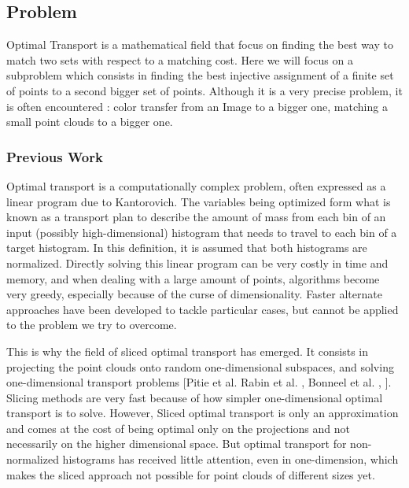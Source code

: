 \documentclass[a4paper,12pt]{article}
\begin{document}

\bigskip


\subsection*{Problem}

Optimal Transport is a mathematical field that focus on finding the best way to match two sets with respect to a matching cost. Here we will focus on a subproblem which consists in finding the best injective assignment of a finite set of points to a second bigger set of points. Although it is a very precise problem, it is often encountered : color transfer from an Image to a bigger one, matching a small point clouds to a bigger one. 

\subsubsection*{Previous Work}

Optimal transport is a computationally complex problem, often expressed as a linear program due to Kantorovich. The variables being optimized form what is known as a transport plan to describe the amount of mass from each bin of an input (possibly high-dimensional) histogram that needs to travel to each bin of a target histogram. In this definition, it is assumed that both histograms are normalized. Directly solving this linear program can be very costly in time and memory, and when dealing with a large amount of points, algorithms become very greedy, especially because of the curse of dimensionality. Faster alternate approaches have been developed to tackle particular cases, but cannot be applied to the problem we try to overcome.

This is why the field of sliced optimal transport has emerged. It consists in projecting the point clouds onto random one-dimensional subspaces, and solving one-dimensional transport problems [Pitie et al. Rabin et al. \cite{pitie2005n}, Bonneel et al. \cite{rabin2011wasserstein}, \cite{bonneel2015sliced}]. Slicing methods are very fast because of how simpler one-dimensional optimal transport is to solve. However, Sliced optimal transport is only an approximation and comes at the cost of being optimal only on the projections and not necessarily on the higher dimensional space.
  But optimal transport for non-normalized histograms has received little attention, even in one-dimension, which makes the sliced approach not possible for point clouds of different sizes yet.
 
\end{document}

